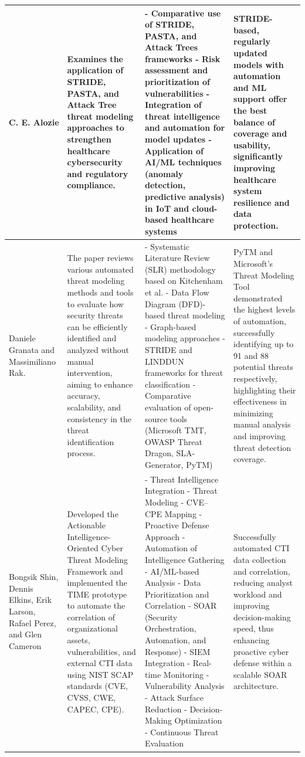 \documentclass[12pt,a4paper]{report}
\begin{document}
\begin{table}[H]
\begin{tabularx}{\textwidth}{|l|l|l|l|}
\hline
[5] C. E. Alozie & Examines the application of STRIDE, PASTA, and Attack Tree threat modeling approaches to strengthen healthcare cybersecurity and regulatory compliance. & - Comparative use of STRIDE, PASTA, and Attack Trees frameworks
- Risk assessment and prioritization of vulnerabilities
- Integration of threat intelligence and automation for model updates
- Application of AI/ML techniques (anomaly detection, predictive analysis) in IoT and cloud-based healthcare systems & STRIDE-based, regularly updated models with automation and ML support offer the best balance of coverage and usability, significantly improving healthcare system resilience and data protection. \\
\hline
[6] Daniele Granata and Massimiliano Rak. & The paper reviews various automated threat modeling methods and tools to evaluate how security threats can be efficiently identified and analyzed without manual intervention, aiming to enhance accuracy, scalability, and consistency in the threat identification process. & - Systematic Literature Review (SLR) methodology based on Kitchenham et al.
- Data Flow Diagram (DFD)-based threat modeling
- Graph-based modeling approaches
- STRIDE and LINDDUN frameworks for threat classification
- Comparative evaluation of open-source tools (Microsoft TMT, OWASP Threat Dragon, SLA-Generator, PyTM) & PyTM and Microsoft’s Threat Modeling Tool demonstrated the highest levels of automation, successfully identifying up to 91 and 88 potential threats respectively, highlighting their effectiveness in minimizing manual analysis and improving threat detection coverage. \\
\hline
[7] Bongsik Shin, Dennis Elkins, Erik Larson, Rafael Perez, and Glen Cameron & Developed the Actionable Intelligence-Oriented Cyber Threat Modeling Framework and implemented the TIME prototype to automate the correlation of organizational assets, vulnerabilities, and external CTI data using NIST SCAP standards (CVE, CVSS, CWE, CAPEC, CPE). & - Threat Intelligence Integration
- Threat Modeling
- CVE–CPE Mapping
- Proactive Defense Approach
- Automation of Intelligence Gathering
- AI/ML-based Analysis
- Data Prioritization and Correlation
- SOAR (Security Orchestration, Automation, and Response)
- SIEM Integration
- Real-time Monitoring
- Vulnerability Analysis
- Attack Surface Reduction
- Decision-Making Optimization
- Continuous Threat Evaluation & Successfully automated CTI data collection and correlation, reducing analyst workload and improving decision-making speed, thus enhancing proactive cyber defense within a scalable SOAR architecture. \\

\end{tabularx}
\end{table}
\end{document}
